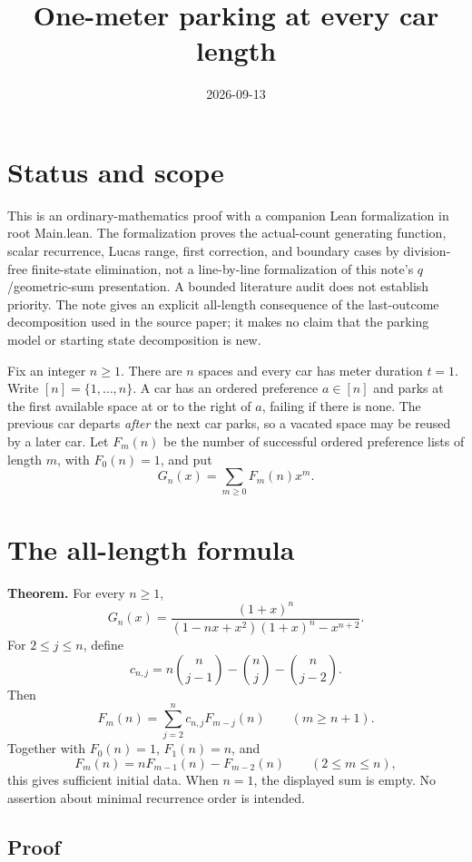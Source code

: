 \documentclass[11pt]{article}
\title{One-meter parking at every car length}
\author{}
\date{2026-09-13}
\begin{document}
\maketitle

\section*{Status and scope}

This is an ordinary-mathematics proof with a companion Lean formalization in
root Main.lean. The formalization proves the actual-count generating function,
scalar recurrence, Lucas range, first correction, and boundary cases by
division-free finite-state elimination, not a line-by-line formalization of
this note's $q$/geometric-sum presentation. A bounded literature audit does
not establish priority. The note gives an explicit
all-length consequence of the last-outcome decomposition used in the source
paper; it makes no claim that the parking model or starting state decomposition
is new.

Fix an integer $n\geq1$. There are $n$ spaces and every car has meter duration
$t=1$. Write $[n]=\{1,\ldots,n\}$. A car has an ordered preference $a\in[n]$
and parks at the first available space at or to the right of $a$, failing if
there is none. The previous car departs \emph{after} the next car parks, so a
vacated space may be reused by a later car. Let $F_m(n)$ be the number of successful ordered
preference lists of length $m$, with $F_0(n)=1$, and put
\[
 G_n(x)=\sum_{m\geq0}F_m(n)x^m.
\]

\section*{The all-length formula}

\textbf{Theorem.} For every $n\geq1$,
\[
 \boxed{G_n(x)=\frac{(1+x)^n}
 {(1-nx+x^2)(1+x)^n-x^{n+2}}.}
\]
For $2\leq j\leq n$, define
\[
 c_{n,j}=n\binom n{j-1}-\binom nj-\binom n{j-2}.
\]
Then
\[
 \boxed{F_m(n)=\sum_{j=2}^n c_{n,j}F_{m-j}(n)\qquad(m\geq n+1).}
\]
Together with $F_0(n)=1$, $F_1(n)=n$, and
\[
 F_m(n)=nF_{m-1}(n)-F_{m-2}(n)\qquad(2\leq m\leq n),
\]
this gives sufficient initial data. When $n=1$, the displayed sum is empty.
No assertion about minimal recurrence order is intended.

\subsection*{Proof}
\end{document}
